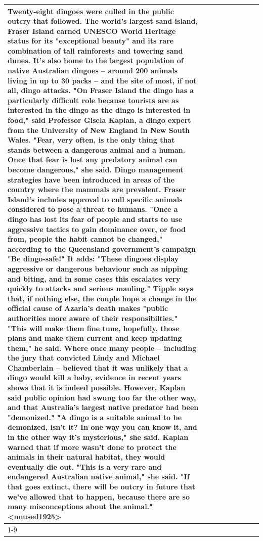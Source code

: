 \begin{table}[H]
\begin{tabular}{lllrlllll}
Twenty-eight dingoes were culled in the public outcry that followed. The world's largest sand island, Fraser Island earned UNESCO World Heritage status for its "exceptional beauty" and its rare combination of tall rainforests and towering sand dunes. It's also home to the largest population of native Australian dingoes -- around 200 animals living in up to 30 packs -- and the site of most, if not all, dingo attacks. "On Fraser Island the dingo has a particularly difficult role because tourists are as interested in the dingo as the dingo is interested in food," said Professor Gisela Kaplan, a dingo expert from the University of New England in New South Wales. "Fear, very often, is the only thing that stands between a dangerous animal and a human. Once that fear is lost any predatory animal can become dangerous," she said. Dingo management strategies have been introduced in areas of the country where the mammals are prevalent. Fraser Island's includes approval to cull specific animals considered to pose a threat to humans. "Once a dingo has lost its fear of people and starts to use aggressive tactics to gain dominance over, or food from, people the habit cannot be changed," according to the Queensland government's campaign "Be dingo-safe!" It adds: "These dingoes display aggressive or dangerous behaviour such as nipping and biting, and in some cases this escalates very quickly to attacks and serious mauling." Tipple says that, if nothing else, the couple hope a change in the official cause of Azaria's death makes "public authorities more aware of their responsibilties." "This will make them fine tune, hopefully, those plans and make them current and keep updating them," he said. Where once many people -- including the jury that convicted Lindy and Michael Chamberlain -- believed that it was unlikely that a dingo would kill a baby, evidence in recent years shows that it is indeed possible. However, Kaplan said public opinion had swung too far the other way, and that Australia's largest native predator had been "demonized." "A dingo is a suitable animal to be demonized, isn't it? In one way you can know it, and in the other way it's mysterious," she said. Kaplan warned that if more wasn't done to protect the animals in their natural habitat, they would eventually die out. "This is a very rare and endangered Australian native animal," she said. "If that goes extinct, there will be outcry in future that we've allowed that to happen, because there are so many misconceptions about the animal."<unused1925> \\
\cline{1-9}

\end{tabular}
\end{table}
